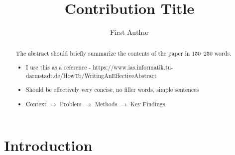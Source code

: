 \documentclass[runningheads]{llncs}
\begin{document}
%
\title{Contribution Title}
%
%
\author{First Author}
%
%


\maketitle              %
%
\begin{abstract}

The abstract should briefly summarize the contents of the paper in
150--250 words.

\begin{itemize}
    \item I use this as a reference - https://www.ias.informatik.tu-darmstadt.de/HowTo/WritingAnEffectiveAbstract
    \item Should be effectively very concise, no filler words, simple sentences
    \item Context $\rightarrow$ Problem $\rightarrow$ Methods $\rightarrow$ Key Findings
\end{itemize}

\end{abstract}
%
%
%
\section{Introduction}
\end{document}
